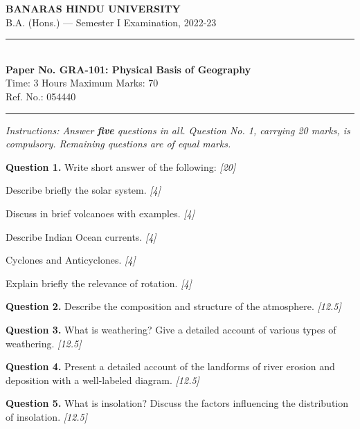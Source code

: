 \documentclass[11pt,a4paper]{article}
\newcommand{\pts}[1]{\hfill   \textit{[#1]}}
\begin{document}
\begin{center}
  {\large\bfseries BANARAS HINDU UNIVERSITY}\\[2pt]
  {\normalsize B.A. (Hons.) --- Semester I Examination, 2022-23}\\[6pt]
  \rule{0.8\linewidth}{0.5pt}\\[6pt]
  {\large\bfseries Paper No. GRA-101: Physical Basis of Geography}\\[4pt]
  {\normalsize Time: 3 Hours \hfill Maximum Marks: 70}\\[2pt]
  {\small Ref. No.: 054440}
\end{center}
\rule{\linewidth}{0.4pt}
\smallskip



\noindent   \textit{Instructions: Answer   \textbf{five} questions in all. Question No. 1, carrying 20 marks, is compulsory. Remaining questions are of equal marks.}
\bigskip




\noindent   \textbf{Question 1.} Write short answer of the following: \pts{20}

\begin{parts}
  \item Describe briefly the solar system. \pts{4}
  \item Discuss in brief volcanoes with examples. \pts{4}
  \item Describe Indian Ocean currents. \pts{4}
  \item Cyclones and Anticyclones. \pts{4}
  \item Explain briefly the relevance of rotation. \pts{4}
\end{parts}

\medskip


\noindent   \textbf{Question 2.} Describe the composition and structure of the atmosphere. \pts{12.5}

\medskip


\noindent   \textbf{Question 3.} What is weathering? Give a detailed account of various types of weathering. \pts{12.5}

\medskip


\noindent   \textbf{Question 4.} Present a detailed account of the landforms of river erosion and deposition with a well-labeled diagram. \pts{12.5}

\medskip


\noindent   \textbf{Question 5.} What is insolation? Discuss the factors influencing the distribution of insolation. \pts{12.5}
\end{document}
